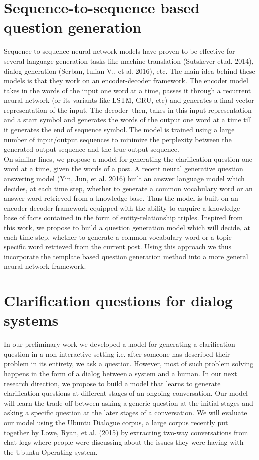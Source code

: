 \documentclass[11pt]{report}
\begin{document}
\newpage
\section{Sequence-to-sequence based question generation}

Sequence-to-sequence neural network models have proven to be effective for several language generation tasks like machine translation (Sutskever et.al. 2014), dialog generation (Serban, Iulian V., et al. 2016), etc. The main idea behind these models is that they work on an encoder-decoder framework. The encoder model takes in the words of the input one word at a time, passes it through a recurrent neural network (or its variants like LSTM, GRU, etc) and generates a final vector representation of the input. The decoder, then, takes in this input representation and a start symbol and generates the words of the output one word at a time till it generates the end of sequence symbol. The model is trained using a large number of input/output sequences to minimize the perplexity between the generated output sequence and the true output sequence.\\

\noindent
On similar lines, we propose a model for generating the clarification question one word at a time, given the words of a post. A recent neural generative question answering model (Yin, Jun, et al.  2016) built an answer language model which decides, at each time step, whether to generate a common vocabulary word or an answer word retrieved from a knowledge base. Thus the model is built on an encoder-decoder framework equipped with the ability to enquire a knowledge base of facts contained in the form of entity-relationship triples. Inspired from this work, we propose to build a question generation model which will decide, at each time step, whether to generate a common vocabulary word or a topic specific word retrieved from the current post. Using this approach we thus incorporate the template based question generation method into a more general neural network framework.

\section{Clarification questions for dialog systems}

In our preliminary work we developed a model for generating a clarification question in a non-interactive setting i.e. after someone has described their problem in its entirety, we ask a question. However, most of such problem solving happens in the form of a dialog between a system and a human. In our next research direction, we propose to build a model that learns to generate  clarification questions at different stages of an ongoing conversation. Our model will learn the trade-off between asking a generic question at the initial stages and asking a specific question at the later stages of a conversation. We will evaluate our model using the Ubuntu Dialogue corpus, a large corpus recently put together by Lowe, Ryan, et al. (2015) by extracting two-way conversations from chat logs where people were discussing about the issues they were having with the Ubuntu Operating system.
\end{document}
